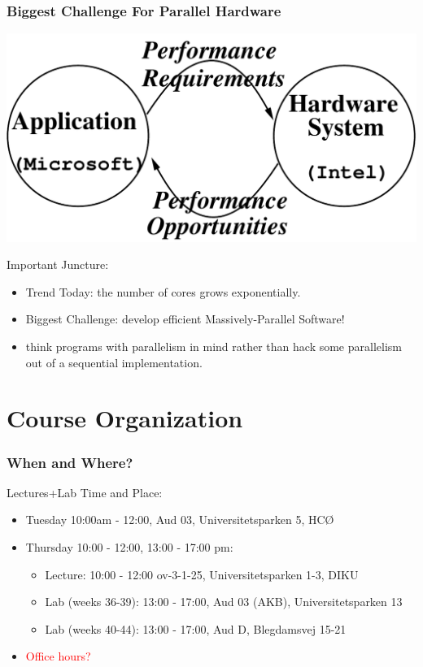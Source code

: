 \documentclass{beamer}
\newcommand{\red}[1]{\textcolor{Red}{{#1}}}
\renewcommand{\emph}[1]{\textcolor{structure}{#1}}
\newcommand{\emp}[1]{\textcolor{DikuRed}{ #1}}
\begin{document}
\begin{frame}[fragile,t]
\frametitle{Biggest Challenge For Parallel Hardware}

\bigskip

\includegraphics[width=29ex]{Figures/L1/Synergy}
\bigskip\pause


\emp{Important Juncture:}\medskip
\begin{itemize}
            \item \emph{Trend Today: the number of cores grows exponentially.}\medskip
            \item \alert{Biggest Challenge: develop efficient Massively-Parallel Software!}\medskip
            \item think programs with parallelism in mind rather 
                    than hack \alert{some} parallelism out of a sequential implementation.
\end  {itemize}
\end{frame}


\section{Course Organization}

\begin{frame}[fragile]
	\tableofcontents[currentsection]
\end{frame}

\begin{frame}[fragile]
\frametitle{When and Where?}
    Lectures+Lab Time and Place:\bigskip
    \begin{itemize}
        \item Tuesday 10:00am - 12:00, Aud 03, Universitetsparken 5, HCØ\medskip
        \item Thursday 10:00 - 12:00, 13:00 - 17:00 pm:\medskip
            \begin{itemize}
                \item Lecture: 10:00 - 12:00  ov-3-1-25, Universitetsparken 1-3, DIKU
                \item Lab (weeks 36-39): 13:00 - 17:00, Aud 03 (AKB), Universitetsparken 13
                \item Lab (weeks 40-44): 13:00 - 17:00, Aud D, Blegdamsvej 15-21
            \end{itemize}
        \item \red{Office hours?}
    \end{itemize}  
\end{frame}
\end{document}
